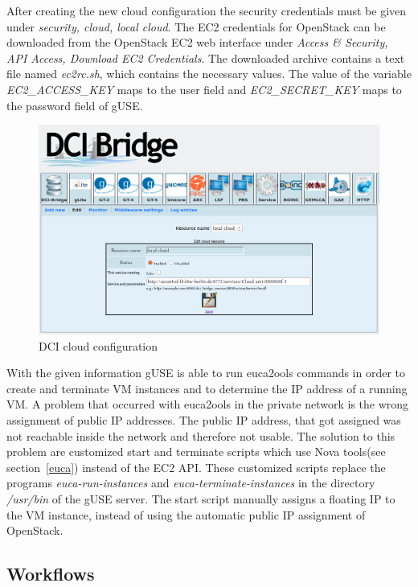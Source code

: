After creating the new cloud configuration the security credentials must be given under \textit{security, cloud, local cloud}.
The EC2 credentials for OpenStack can be downloaded from the OpenStack EC2 web interface under \textit{Access \& Security, API Access, Download EC2 Credentials}.
The downloaded archive contains a text file named \textit{ec2rc.sh}, which contains the necessary values.
The value of the variable \textit{EC2\_ACCESS\_KEY} maps to the user field and \textit{EC2\_SECRET\_KEY} maps to the password field of gUSE.

\begin{figure}%
                \centering
                \includegraphics[width=2.0\columnwidth]{images/dci-cloud-settings.png}
                \caption{DCI cloud configuration}
                \label{fig:cloudconfig}
\end{figure}

With the given information gUSE is able to run euca2ools commands in order to create and terminate VM instances and to determine the IP address of a running VM.
A problem that occurred with euca2ools in the private network is the wrong assignment of public IP addresses.
The public IP address, that got assigned was not reachable inside the network and therefore not usable.
The solution to this problem are customized start and terminate scripts \cite{customscripts} which use Nova tools(see section~\ref{euca}) instead of the EC2 API.
These customized scripts replace the programs \textit{euca-run-instances} and \textit{euca-terminate-instances} in the directory \textit{/usr/bin} of the gUSE server.
The start script manually assigns a floating IP to the VM instance, instead of using the automatic public IP assignment of OpenStack.

\subsection{Workflows}\label{workflowimplementation}

